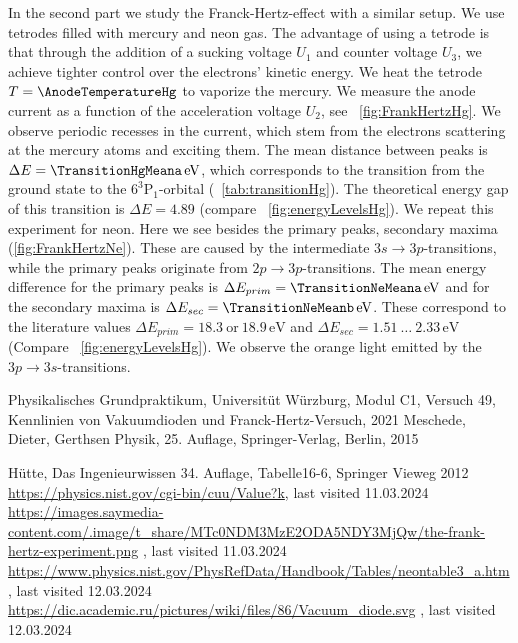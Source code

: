 \documentclass[a4paper,10pt,twocolumn]{article}
\newcommand{\eV}{\, \mathrm{eV}}
\newcommand{\HgLevelA}{6^3\mathrm{P}_1}
\newcommand{\TheoreticalTransitionHga}{4.89}
\newcommand{\TheoreticalTransitionNea}{18.9}
\newcommand{\TheoreticalTransitionNeaa}{18.3}
\newcommand{\TheoreticalTransitionNeb}{1.51 \ \dots \ 2.33}
\begin{document}
    In the second part we study the Franck-Hertz-effect with a similar setup.
    We use tetrodes filled with mercury and neon gas.
    The advantage of using a tetrode is that through the addition of a sucking voltage $U_1$ and counter voltage
    $U_3$, we achieve tighter control over the electrons' kinetic energy.
    We heat the tetrode $T = \AnodeTemperatureHg$ to vaporize the mercury.
    We measure the anode current as a function of the acceleration voltage $U_2$, see ~\autoref{fig:FrankHertzHg}.
    We observe periodic recesses in the current, which stem from the electrons scattering 
    at the mercury atoms and exciting them.
    The mean distance between peaks is $\Delta E = \TransitionHgMeana \eV$, which corresponds to the 
    transition from the ground state to the $\HgLevelA$-orbital (~\autoref{tab:transitionHg}).
    The theoretical energy gap of this transition is $\Delta E = \TheoreticalTransitionHga$
    (compare ~\autoref{fig:energyLevelsHg}).
    We repeat this experiment for neon.
    Here we see besides the primary peaks, secondary maxima (\autoref{fig:FrankHertzNe}).
    These are caused by the intermediate $3s \rightarrow 3p$-transitions, while the primary peaks originate
    from $2p \rightarrow 3p$-transitions.
    The mean energy difference for the primary peaks is $\Delta E_{prim} = \TransitionNeMeana \eV$ and for the
    secondary maxima is $\Delta E_{sec} = \TransitionNeMeanb \eV$.
    These correspond to the literature values 
    $\Delta E_{prim} = \TheoreticalTransitionNeaa \ \mathrm{or} \ \TheoreticalTransitionNea \eV$
    and $\Delta E_{sec} = \TheoreticalTransitionNeb \eV$ (Compare ~\autoref{fig:energyLevelsHg}).
    We observe the orange light emitted by the $3p \rightarrow 3s$-transitions.


    \begin{thebibliography}{}    %
         Physikalisches Grundpraktikum, Universitüt Würzburg, Modul C1, Versuch 49, Kennlinien von Vakuumdioden
        und Franck-Hertz-Versuch, 2021
         Meschede, Dieter, Gerthsen Physik, 25. Auflage, Springer-Verlag, Berlin, 2015

          Hütte, Das Ingenieurwissen 34. Auflage, Tabelle16-6, Springer Vieweg 2012
          \url{https://physics.nist.gov/cgi-bin/cuu/Value?k}, last visited 11.03.2024
         \url{https://images.saymedia-content.com/.image/t_share/MTc0NDM3MzE2ODA5NDY3MjQw/the-frank-hertz-experiment.png} , last visited 11.03.2024
         \url{https://www.physics.nist.gov/PhysRefData/Handbook/Tables/neontable3_a.htm} , last visited 12.03.2024
         \url{https://dic.academic.ru/pictures/wiki/files/86/Vacuum_diode.svg} , last visited 12.03.2024
    \end{thebibliography}
    
\end{document}
